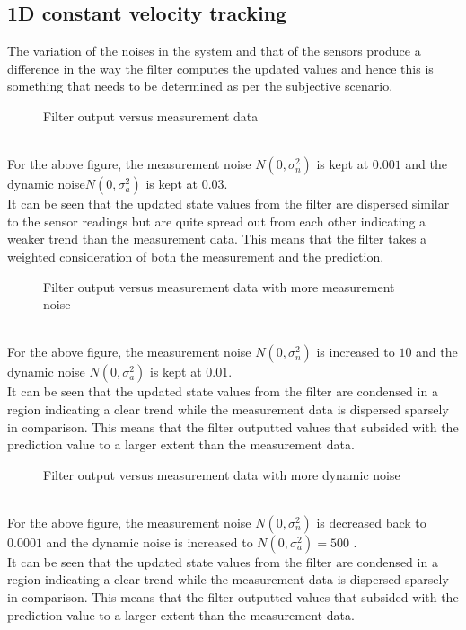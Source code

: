\documentclass{article}
\begin{document}
	\subsection{1D constant velocity tracking}
	\begin{FlushLeft}
		The variation of the noises in the system and that of the sensors produce a difference in the way the filter computes the updated values and hence this is something that needs to be determined as per the subjective scenario.
		\begin{figure}[H]
			\raggedleft
			\caption{Filter output versus measurement data}
			\end{figure}\hfill  \\
		For the above figure, the measurement noise $N(0,\sigma_n^2)$ is kept at $0.001$ and the dynamic noise$N(0,\sigma_a^2)$ is kept at $0.03$. \hfill  \\It can be seen that the updated state values from the filter are dispersed similar to the sensor readings but are quite spread out from each other indicating a weaker trend than the measurement data. This means that the filter takes a weighted consideration of both the measurement and the prediction.
		\FloatBarrier

		\pagebreak
		\begin{figure}[H]
			\raggedleft
			\caption{Filter output versus measurement data with more measurement noise}
			\end{figure}\hfill  \\
		For the above figure, the measurement noise $N(0,\sigma_n^2)$ is increased to $10$ and the dynamic noise $N(0,\sigma_a^2)$ is kept at $0.01$. \hfill  \\It can be seen that the updated state values from the filter are condensed in a region indicating a clear trend while the measurement data is dispersed sparsely in comparison. This means that the filter outputted values that subsided with the prediction value to a larger extent than the measurement data.
			\FloatBarrier

		\pagebreak
		\begin{figure}[H]
			\raggedleft
			\caption{Filter output versus measurement data with more dynamic noise}
			\end{figure}\hfill  \\
		For the above figure, the measurement noise $N(0,\sigma_n^2)$ is decreased back to $0.0001$ and the dynamic noise is increased to $N(0,\sigma_a^2) = 500$ . \hfill  \\It can be seen that the updated state values from the filter are condensed in a region indicating a clear trend while the measurement data is dispersed sparsely in comparison. This means that the filter outputted values that subsided with the prediction value to a larger extent than the measurement data.
			\FloatBarrier
		\end{FlushLeft}
\end{document}
